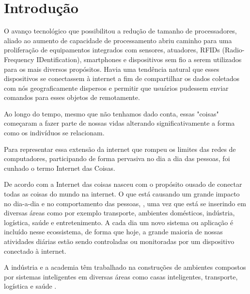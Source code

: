 %
%

\chapter{Introdução} \label{chap:Intro}
O avanço tecnológico que possibilitou a redução de tamanho de processadores, aliado ao aumento de capacidade de processamento abriu caminho para uma proliferação de equipamentos integrados com sensores, atuadores, RFIDs (Radio-Frequency IDentification), smartphones e dispositivos sem fio a serem utilizados para os mais diversos propósitos. Havia uma tendência natural que esses dispositivos se conectassem à internet a fim de compartilhar os dados coletados com nós geograficamente dispersos e permitir que usuários pudessem enviar comandos para esses objetos de remotamente.

Ao longo do tempo, mesmo que não tenhamos dado conta, essas "coisas" começaram a fazer parte de nossas vidas alterando significativamente a forma como os indivíduos se relacionam.


Para representar essa extensão da internet que rompeu os limites das redes de computadores, participando de forma pervasiva no dia a dia das pessoas, foi cunhado o termo Internet das Coisas.

De acordo com \cite{000-000} a Internet das coisas nasceu com o propósito ousado de conectar todas as coisas do mundo na internet. O que está causando um grande impacto no dia-a-dia e no comportamento das pessoas, \cite{000-003}, uma vez que está se inserindo em diversas áreas como por exemplo transporte, ambientes domésticos, indústria, logística, saúde e entretenimento. A cada dia um novo sistema ou aplicação é incluído nesse ecossistema, de forma que hoje, a grande maioria de nossas atividades diárias estão sendo controladas ou monitoradas por um dispositivo conectado à internet.

A indústria e a academia têm trabalhado na construções de ambientes compostos por sistemas inteligentes em diversas áreas como casas inteligentes, transporte, logística e saúde \cite{000-000}.

